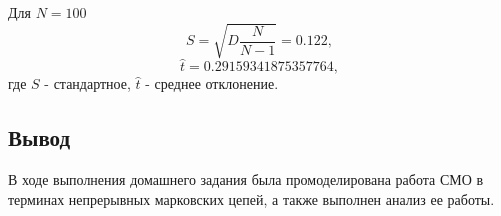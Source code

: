 Для $N=100$
$$S=\sqrt{D\frac{N}{N-1}}= 0.122,$$
$$\hat{t}=0.29159341875357764,$$
где $S$ - стандартное, $\hat{t}$ - среднее отклонение.

\subsection{Вывод}
В ходе выполнения домашнего задания была промоделирована работа СМО в терминах непрерывных марковских цепей,
а также выполнен анализ ее работы.


